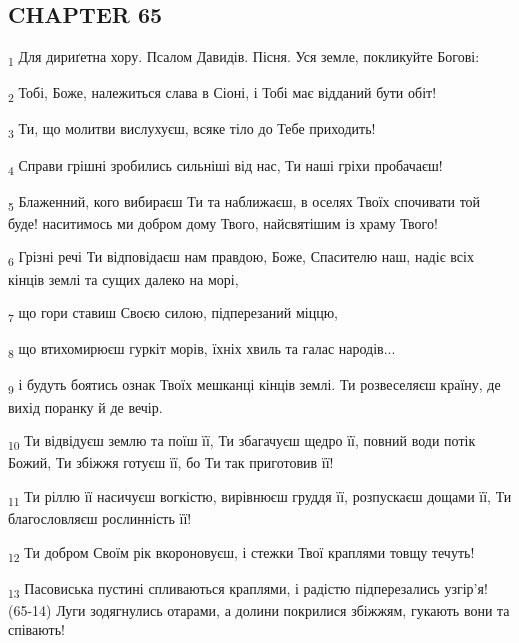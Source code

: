 \subsection{CHAPTER 65}
\begin{tcolorbox}
\textsubscript{1} Для дириґетна хору. Псалом Давидів. Пісня. Уся земле, покликуйте Богові:
\end{tcolorbox}
\begin{tcolorbox}
\textsubscript{2} Тобі, Боже, належиться слава в Сіоні, і Тобі має відданий бути обіт!
\end{tcolorbox}
\begin{tcolorbox}
\textsubscript{3} Ти, що молитви вислухуєш, всяке тіло до Тебе приходить!
\end{tcolorbox}
\begin{tcolorbox}
\textsubscript{4} Справи грішні зробились сильніші від нас, Ти наші гріхи пробачаєш!
\end{tcolorbox}
\begin{tcolorbox}
\textsubscript{5} Блаженний, кого вибираєш Ти та наближаєш, в оселях Твоїх спочивати той буде! наситимось ми добром дому Твого, найсвятішим із храму Твого!
\end{tcolorbox}
\begin{tcolorbox}
\textsubscript{6} Грізні речі Ти відповідаєш нам правдою, Боже, Спасителю наш, надіє всіх кінців землі та сущих далеко на морі,
\end{tcolorbox}
\begin{tcolorbox}
\textsubscript{7} що гори ставиш Своєю силою, підперезаний міццю,
\end{tcolorbox}
\begin{tcolorbox}
\textsubscript{8} що втихомирюєш гуркіт морів, їхніх хвиль та галас народів...
\end{tcolorbox}
\begin{tcolorbox}
\textsubscript{9} і будуть боятись ознак Твоїх мешканці кінців землі. Ти розвеселяєш країну, де вихід поранку й де вечір.
\end{tcolorbox}
\begin{tcolorbox}
\textsubscript{10} Ти відвідуєш землю та поїш її, Ти збагачуєш щедро її, повний води потік Божий, Ти збіжжя готуєш її, бо Ти так приготовив її!
\end{tcolorbox}
\begin{tcolorbox}
\textsubscript{11} Ти ріллю її насичуєш вогкістю, вирівнюєш груддя її, розпускаєш дощами її, Ти благословляєш рослинність її!
\end{tcolorbox}
\begin{tcolorbox}
\textsubscript{12} Ти добром Своїм рік вкороновуєш, і стежки Твої краплями товщу течуть!
\end{tcolorbox}
\begin{tcolorbox}
\textsubscript{13} Пасовиська пустині спливаються краплями, і радістю підперезались узгір'я! (65-14) Луги зодягнулись отарами, а долини покрилися збіжжям, гукають вони та співають!
\end{tcolorbox}
